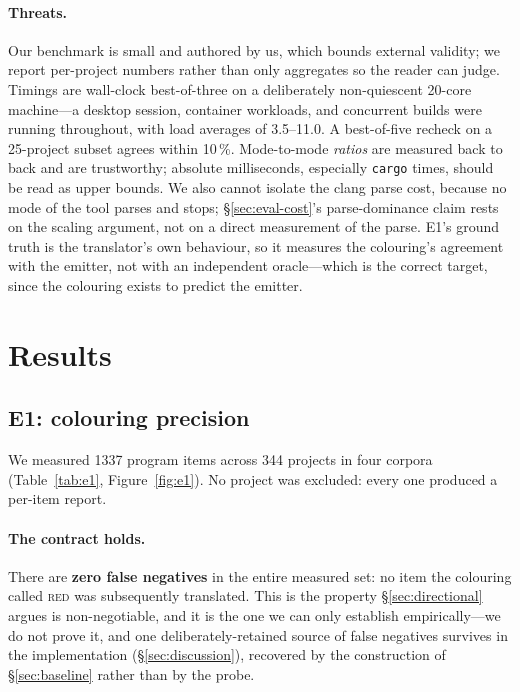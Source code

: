 \documentclass[10pt,twocolumn]{article}
\newcommand{\red}[1]{\textcolor{cred}{\textsc{#1}}}
\begin{document}
\paragraph{Threats.} Our benchmark is small and authored by us, which bounds
external validity; we report per-project numbers rather than only aggregates
so the reader can judge. Timings are wall-clock best-of-three on a deliberately
non-quiescent 20-core machine---a desktop session, container workloads, and
concurrent builds were running throughout, with load averages of 3.5--11.0. A
best-of-five recheck on a 25-project subset agrees within 10\,\%. Mode-to-mode
\emph{ratios} are measured back to back and are trustworthy; absolute
milliseconds, especially \texttt{cargo} times, should be read as upper bounds.
We also cannot isolate the clang parse cost, because no mode of the tool
parses and stops; \S\ref{sec:eval-cost}'s parse-dominance claim rests on the
scaling argument, not on a direct measurement of the parse. E1's ground
truth is the translator's own behaviour, so it measures the colouring's
agreement with the emitter, not with an independent oracle---which is the
correct target, since the colouring exists to predict the emitter.

\section{Results}
\label{sec:eval}

\subsection{E1: colouring precision}
\label{sec:eval-precision}

We measured 1337 program items across 344 projects in four corpora
(Table~\ref{tab:e1}, Figure~\ref{fig:e1}). No project was excluded: every one
produced a per-item report.

\paragraph{The contract holds.} There are \textbf{zero false negatives} in the
entire measured set: no item the colouring called \red{red} was subsequently
translated. This is the property \S\ref{sec:directional} argues is
non-negotiable, and it is the one we can only establish empirically---we do
not prove it, and one deliberately-retained source of false negatives survives
in the implementation (\S\ref{sec:discussion}), recovered by the construction
of \S\ref{sec:baseline} rather than by the probe.
\end{document}
